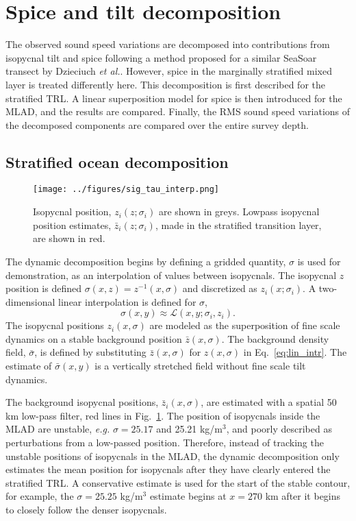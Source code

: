 \documentclass[preprint,NumberedRefs]{JASA}
\begin{document}
\section{\label{sec:decomposition}Spice and tilt decomposition}
The observed sound speed variations are decomposed into contributions from isopycnal tilt and spice following a method proposed for a similar SeaSoar transect by Dzieciuch \emph{et al.}.\citep{dzieciuch2004} However, spice in the marginally stratified mixed layer is treated differently here. This decomposition is first described for the stratified TRL. A linear superposition model for spice is then introduced for the MLAD, and the results are compared. Finally, the RMS sound speed variations of the decomposed components are compared over the entire survey depth.

\subsection{Stratified ocean decomposition}
\begin{figure}
\texttt{[image: ../figures/sig\_tau\_interp.png]}
    \caption{\label{fig:cntrs}{Isopycnal position, $z_i(z; \sigma_i)$ are shown in greys. Lowpass isopycnal position estimates, $\bar{z}_i(z; \sigma_i)$, made in the stratified transition layer, are shown in red.}}
\end{figure}

The dynamic decomposition begins by defining a gridded quantity, $\sigma$ is used for demonstration, as an interpolation of values between isopycnals. The isopycnal $z$ position is defined $\sigma(x, z) = z^{-1}(x, \sigma)$ and discretized as $z_i(x; \sigma_i)$. A two-dimensional linear interpolation is defined for $\sigma$,
\begin{equation}
    \sigma(x,y)\approx\mathcal{L}(x, y; \sigma_i, z_i).
    \label{eq:lin_intr}
\end{equation}
The isopycnal positions $z_i(x, \sigma)$ are modeled as the superposition of fine scale dynamics on a stable background position $\bar{z}(x, \sigma)$. The background density field, $\bar{\sigma}$, is defined by substituting $\bar{z}(x, \sigma)$ for $z(x, \sigma)$ in Eq.~\eqref{eq:lin_intr}. The estimate of $\bar{\sigma}(x,y)$ is a vertically stretched field without fine scale tilt dynamics.

The background isopycnal positions, $\bar{z}_i(x, \sigma)$, are estimated with a spatial 50 km low-pass filter, red lines in Fig.~\ref{fig:cntrs}. The position of isopycnals inside the MLAD are unstable, \emph{e.g.} $\sigma=25.17$ and 25.21 kg/m$^3$, and poorly described as perturbations from a low-passed position. Therefore, instead of tracking the unstable positions of isopycnals in the MLAD, the dynamic decomposition only estimates the mean position for isopycnals after they have clearly entered the stratified TRL. A conservative estimate is used for the start of the stable contour, for example, the $\sigma=25.25$ kg/m$^3$ estimate begins at $x=270$ km after it begins to closely follow the denser isopycnals.
\end{document}
